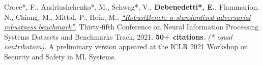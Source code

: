




\begin{cvparagraph}
\vspace{5.0mm}
\begin{cvitems}
    \item Croce*, F., Andriushchenko*, M., Sehwag*, V., \textbf{Debenedetti*, E.}, Flammarion, N., Chiang, M., Mittal, P., Hein, M., \textit{\href{https://openreview.net/forum?id=SSKZPJCt7B}{``RobustBench: a standardized adversarial robustness benchmark''}}, Thirty‑fifth Conference on Neural Information Processing Systems Datasets and Benchmarks Track, 2021. \textbf{50+ citations}. \textit{(* equal contribution)}. A preliminary version appeared at the ICLR 2021 Workshop on Security and Safety in ML Systems.
\end{cvitems}
\end{cvparagraph}
\vspace{2.5mm}
